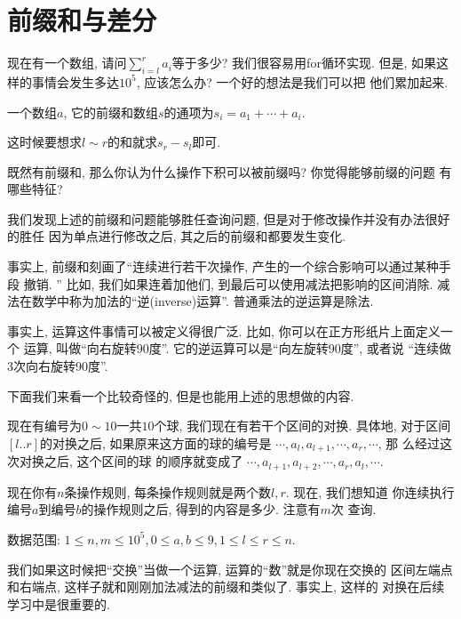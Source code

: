 \section{前缀和与差分}

现在有一个数组, 请问$\sum_{i=l}^r a_i$等于多少? 我们很容易用for循环实现. 
但是, 如果这样的事情会发生多达$10^5$, 应该怎么办? 一个好的想法是我们可以把
他们累加起来. 

\begin{definition}
    一个数组$a$, 它的前缀和数组$s$的通项为$s_i = a_1 + \cdots + a_i$. 
\end{definition}

这时候要想求$l\sim r$的和就求$s_r - s_l$即可. 

\begin{ques}
    既然有前缀和, 那么你认为什么操作下积可以被前缀吗? 你觉得能够前缀的问题
    有哪些特征?  
\end{ques}

我们发现上述的前缀和问题能够胜任查询问题, 但是对于修改操作并没有办法很好的胜任
因为单点进行修改之后, 其之后的前缀和都要发生变化. 

事实上, 前缀和刻画了``连续进行若干次操作, 产生的一个综合影响可以通过某种手段
撤销. '' 比如, 我们如果连着加他们, 到最后可以使用减法把影响的区间消除. 
减法在数学中称为加法的``逆(inverse)运算''. 普通乘法的逆运算是除法. 

事实上, 运算这件事情可以被定义得很广泛. 比如, 你可以在正方形纸片上面定义一个
运算, 叫做``向右旋转90度''. 它的逆运算可以是``向左旋转90度'', 或者说
``连续做3次向右旋转90度''. 

下面我们来看一个比较奇怪的, 但是也能用上述的思想做的内容. 

\begin{example}
    现在有编号为$0\sim 10$一共$10$个球, 我们现在有若干个区间的对换. 具体地, 
    对于区间$[l..r]$的对换之后, 如果原来这方面的球的编号是
    $\cdots, a_l, a_{l+1}, \cdots, a_r, \cdots$, 那
    么经过这次对换之后, 这个区间的球
    的顺序就变成了
    $\cdots, a_{l+1}, a_{l+2}, \cdots , a_r, a_l,\cdots $. 

    现在你有$n$条操作规则, 每条操作规则就是两个数$l,r$. 现在, 我们想知道
    你连续执行编号$a$到编号$b$的操作规则之后, 得到的内容是多少. 注意有$m$次
    查询. 

    数据范围: $1\leq n, m \leq 10^5, 0\leq a, b\leq 9, 1\leq l\leq r\leq n.$
\end{example}

我们如果这时候把``交换''当做一个运算, 运算的``数''就是你现在交换的
区间左端点和右端点, 这样子就和刚刚加法减法的前缀和类似了. 事实上, 这样的
对换在后续学习中是很重要的. 

